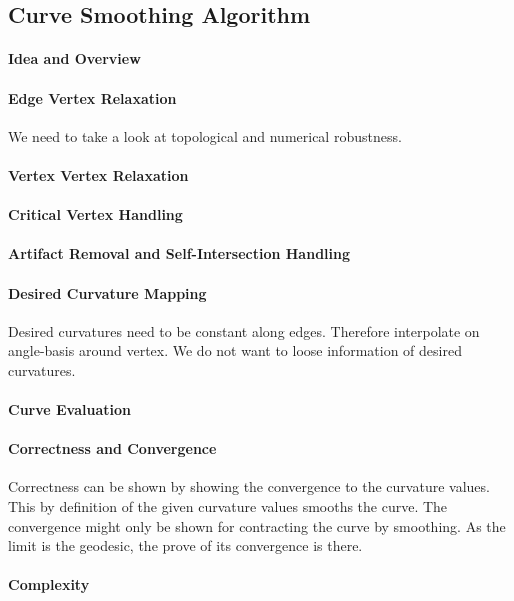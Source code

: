 \documentclass{stdlocal}
\begin{document}
\subsection{Curve Smoothing Algorithm} %
\label{sub:curve_smoothing_algorithm}
  \paragraph{Idea and Overview}
  \paragraph{Edge Vertex Relaxation}
    We need to take a look at topological and numerical robustness.
  \paragraph{Vertex Vertex Relaxation}
  \paragraph{Critical Vertex Handling}
  \paragraph{Artifact Removal and Self-Intersection Handling}
  \paragraph{Desired Curvature Mapping}
    Desired curvatures need to be constant along edges.
    Therefore interpolate on angle-basis around vertex.
    We do not want to loose information of desired curvatures.
  \paragraph{Curve Evaluation}
  \paragraph{Correctness and Convergence}
    Correctness can be shown by showing the convergence to the curvature values.
    This by definition of the given curvature values smooths the curve.
    The convergence might only be shown for contracting the curve by smoothing.
    As the limit is the geodesic, the prove of its convergence is there.
  \paragraph{Complexity}

\end{document}
